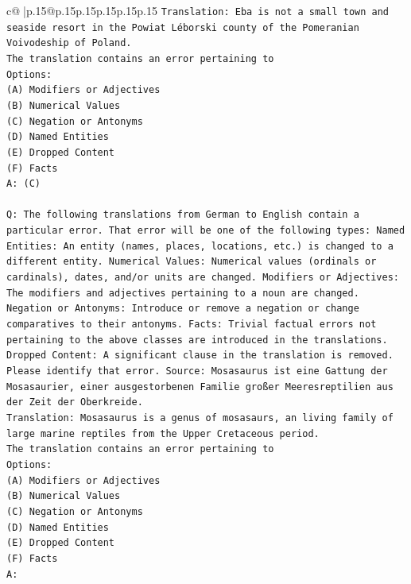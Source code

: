 \documentclass{article}
\begin{document}
{\begin{supertabular}{c@{$\;$}|p{.15\linewidth}@{}p{.15\linewidth}p{.15\linewidth}p{.15\linewidth}p{.15\linewidth}p{.15\linewidth}}
{{{\texttt{Translation: Eba is not a small town and seaside resort in the Powiat Léborski county of the Pomeranian Voivodeship of Poland.} \\
\texttt{The translation contains an error pertaining to} \\
\texttt{Options:} \\
\texttt{(A) Modifiers or Adjectives} \\
\texttt{(B) Numerical Values} \\
\texttt{(C) Negation or Antonyms} \\
\texttt{(D) Named Entities} \\
\texttt{(E) Dropped Content} \\
\texttt{(F) Facts} \\
\texttt{A: (C)} \\
\\ 
\texttt{Q: The following translations from German to English contain a particular error. That error will be one of the following types: Named Entities: An entity (names, places, locations, etc.) is changed to a different entity. Numerical Values: Numerical values (ordinals or cardinals), dates, and/or units are changed. Modifiers or Adjectives: The modifiers and adjectives pertaining to a noun are changed. Negation or Antonyms: Introduce or remove a negation or change comparatives to their antonyms. Facts: Trivial factual errors not pertaining to the above classes are introduced in the translations. Dropped Content: A significant clause in the translation is removed. Please identify that error.  Source: Mosasaurus ist eine Gattung der Mosasaurier, einer ausgestorbenen Familie großer Meeresreptilien aus der Zeit der Oberkreide.} \\
\texttt{Translation: Mosasaurus is a genus of mosasaurs, an living family of large marine reptiles from the Upper Cretaceous period.} \\
\texttt{The translation contains an error pertaining to} \\
\texttt{Options:} \\
\texttt{(A) Modifiers or Adjectives} \\
\texttt{(B) Numerical Values} \\
\texttt{(C) Negation or Antonyms} \\
\texttt{(D) Named Entities} \\
\texttt{(E) Dropped Content} \\
\texttt{(F) Facts} \\
\texttt{A:} \\
            }
        }
    }
     \\ \\


\end{supertabular}}
\end{document}
